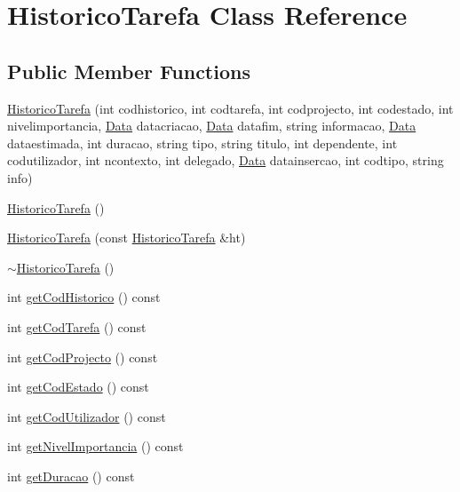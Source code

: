 \hypertarget{class_historico_tarefa}{\section{Historico\-Tarefa Class Reference}
\label{class_historico_tarefa}
}
\subsection*{Public Member Functions}
\begin{DoxyCompactItemize}
\item 
\hyperlink{class_historico_tarefa_a1786e5b2678cdc9910c2b6a7f3e74330}{Historico\-Tarefa} (int codhistorico, int codtarefa, int codprojecto, int codestado, int nivelimportancia, \hyperlink{class_data}{Data} datacriacao, \hyperlink{class_data}{Data} datafim, string informacao, \hyperlink{class_data}{Data} dataestimada, int duracao, string tipo, string titulo, int dependente, int codutilizador, int ncontexto, int delegado, \hyperlink{class_data}{Data} datainsercao, int codtipo, string info)
\item 
\hyperlink{class_historico_tarefa_a52e29da81a693f83efaed78f9b0f1fb9}{Historico\-Tarefa} ()
\item 
\hyperlink{class_historico_tarefa_a071695f253833308b60d41e199e5dd61}{Historico\-Tarefa} (const \hyperlink{class_historico_tarefa}{Historico\-Tarefa} \&ht)
\item 
\hyperlink{class_historico_tarefa_a729b34daa45811d311a430427df8f326}{$\sim$\-Historico\-Tarefa} ()
\item 
int \hyperlink{class_historico_tarefa_ad3ceece1848a4dd29c1164fa3f08822c}{get\-Cod\-Historico} () const 
\item 
int \hyperlink{class_historico_tarefa_a6cd3c0353c8759cc439a8aa05afa3da6}{get\-Cod\-Tarefa} () const 
\item 
int \hyperlink{class_historico_tarefa_a9ea71bd580500e92bc381cdb537b22ff}{get\-Cod\-Projecto} () const 
\item 
int \hyperlink{class_historico_tarefa_ab46a060a3125e8ef02cf3260f689f90a}{get\-Cod\-Estado} () const 
\item 
int \hyperlink{class_historico_tarefa_a994cc7e2e6cb57cfa60fedb652339feb}{get\-Cod\-Utilizador} () const 
\item 
int \hyperlink{class_historico_tarefa_ab5ca8e12fd7f685733c5b8498fae02e4}{get\-Nivel\-Importancia} () const 
\item 
int \hyperlink{class_historico_tarefa_aba55cd9499fb7f6f87cc127ac39da81f}{get\-Duracao} () const 

\end{DoxyCompactItemize}

